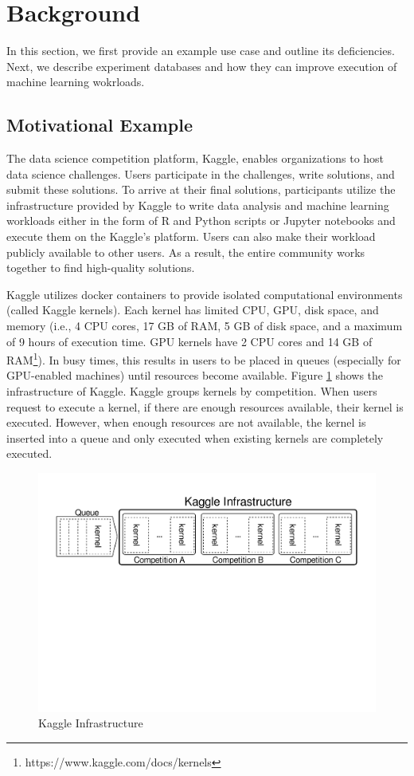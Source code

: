 \section{Background} \label{sec-background}
In this section, we first provide an example use case and outline its deficiencies.
Next, we describe experiment databases and how they can improve execution of machine learning wokrloads.

\subsection{Motivational Example}\label{subsec-motivational-example}
The data science competition platform, Kaggle, enables organizations to host data science challenges.
Users participate in the challenges, write solutions, and submit these solutions.
To arrive at their final solutions, participants utilize the infrastructure provided by Kaggle to write data analysis and machine learning workloads either in the form of R and Python scripts or Jupyter notebooks and execute them on the Kaggle's platform.
Users can also make their workload publicly available to other users.
As a result, the entire community works together to find high-quality solutions.

Kaggle utilizes docker containers to provide isolated computational environments (called Kaggle kernels).
Each kernel has limited CPU, GPU, disk space, and memory (i.e., 4 CPU cores, 17 GB of RAM, 5 GB of disk space, and a maximum of 9 hours of execution time. GPU kernels have 2 CPU cores and 14 GB of RAM\footnote{https://www.kaggle.com/docs/kernels}).
In busy times, this results in users to be placed in queues (especially for GPU-enabled machines) until resources become available.
Figure \ref{example-use-case} shows the infrastructure of Kaggle.
Kaggle groups kernels by competition.
When users request to execute a kernel, if there are enough resources available, their kernel is executed.
However, when enough resources are not available, the kernel is inserted into a queue and only executed when existing kernels are completely executed.

\begin{figure}
\centering
\includegraphics[width=\columnwidth]{../images/example-use-case}
\caption{Kaggle Infrastructure}
\label{example-use-case}
\end{figure}

